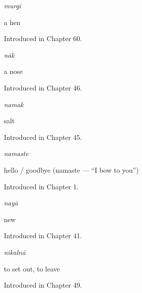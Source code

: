 \noindent\begin{minipage}[t]{\linewidth}
\raggedright
\textbf{}\enspace\emph{murgī}\par
\small a hen\par
\footnotesize Introduced in Chapter 60.
\end{minipage}\par\medskip

\noindent\begin{minipage}[t]{\linewidth}
\raggedright
\textbf{}\enspace\emph{nāk}\par
\small a nose\par
\footnotesize Introduced in Chapter 46.
\end{minipage}\par\medskip

\noindent\begin{minipage}[t]{\linewidth}
\raggedright
\textbf{}\enspace\emph{namak}\par
\small salt\par
\footnotesize Introduced in Chapter 45.
\end{minipage}\par\medskip

\noindent\begin{minipage}[t]{\linewidth}
\raggedright
\textbf{}\enspace\emph{namaste}\par
\small hello / goodbye (namaste — \textquotedblleft{}I bow to you\textquotedblright{})\par
\footnotesize Introduced in Chapter 1.
\end{minipage}\par\medskip

\noindent\begin{minipage}[t]{\linewidth}
\raggedright
\textbf{}\enspace\emph{nayā}\par
\small new\par
\footnotesize Introduced in Chapter 41.
\end{minipage}\par\medskip

\noindent\begin{minipage}[t]{\linewidth}
\raggedright
\textbf{}\enspace\emph{nikalnā}\par
\small to set out, to leave\par
\footnotesize Introduced in Chapter 49.
\end{minipage}\par\medskip

